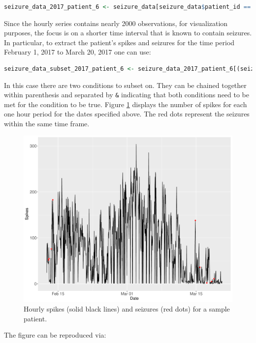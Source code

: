 \begin{lstlisting}[language=R]
seizure_data_2017_patient_6 <- seizure_data[seizure_data$patient_id == 'Patient_6', ]
\end{lstlisting}
Since the hourly series contains nearly 2000 observations, for visualization purposes, the focus is on a shorter time interval that is known to contain seizures. In particular, to extract the patient's spikes and seizures for the time period February 1, 2017 to March 20, 2017 one can use:
\begin{lstlisting}[language=R]
seizure_data_subset_2017_patient_6 <- seizure_data_2017_patient_6[(seizure_data_2017_patient_6$hourly_markers > '2017-02-01 00:00:00 UTC') & (seizure_data_2017_patient_6$hourly_markers <= '2017-03-20 00:00:00 UTC'),]
\end{lstlisting}
In this case there are two conditions to subset on. They can be chained together within parenthesis and separated by \verb|&| indicating that both conditions need to be met for the condition to be true.
Figure \ref{fig:time_seizure_spikes} displays the number of spikes for each one hour period for the dates specified above. The red dots represent the seizures within the same time frame.
\begin{figure}[H]
  \centering
   \includegraphics[width=\textwidth]{chapters/CodingBasics/figures/hourly_seizure_spikes.pdf}
  \caption{Hourly spikes (solid black lines) and seizures (red dots) for a sample patient.}
  \label{fig:time_seizure_spikes}
\end{figure}
The figure can be reproduced via:
